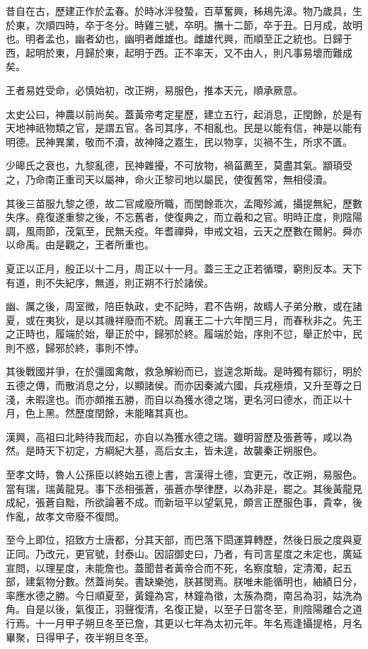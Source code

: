 昔自在古，歷建正作於孟春。於時冰泮發蟄，百草奮興，秭鳺先滜。物乃歲具，生於東，次順四時，卒于冬分。時雞三號，卒明。撫十二節，卒于丑。日月成，故明也。明者孟也，幽者幼也，幽明者雌雄也。雌雄代興，而順至正之統也。日歸于西，起明於東，月歸於東，起明于西。正不率天，又不由人，則凡事易壞而難成矣。

王者易姓受命，必慎始初，改正朔，易服色，推本天元，順承厥意。

太史公曰，神農以前尚矣。蓋黃帝考定星歷，建立五行，起消息，正閏餘，於是有天地神祇物類之官，是謂五官。各司其序，不相亂也。民是以能有信，神是以能有明德。民神異業，敬而不瀆，故神降之嘉生，民以物享，災禍不生，所求不匱。

少暤氏之衰也，九黎亂德，民神雜擾，不可放物，禍菑薦至，莫盡其氣。顓頊受之，乃命南正重司天以屬神，命火正黎司地以屬民，使復舊常，無相侵瀆。

其後三苗服九黎之德，故二官咸廢所職，而閏餘乖次，孟陬殄滅，攝提無紀，歷數失序。堯復遂重黎之後，不忘舊者，使復典之，而立羲和之官。明時正度，則陰陽調，風雨節，茂氣至，民無夭疫。年耆禪舜，申戒文祖，云天之歷數在爾躬。舜亦以命禹。由是觀之，王者所重也。

夏正以正月，殷正以十二月，周正以十一月。蓋三王之正若循環，窮則反本。天下有道，則不失紀序，無道，則正朔不行於諸侯。

幽、厲之後，周室微，陪臣執政，史不記時，君不告朔，故疇人子弟分散，或在諸夏，或在夷狄，是以其禨祥廢而不統。周襄王二十六年閏三月，而春秋非之。先王之正時也，履端於始，舉正於中，歸邪於終。履端於始，序則不愆，舉正於中，民則不惑，歸邪於終，事則不悖。

其後戰國并爭，在於彊國禽敵，救急解紛而已，豈遑念斯哉。是時獨有鄒衍，明於五德之傳，而散消息之分，以顯諸侯。而亦因秦滅六國，兵戎極煩，又升至尊之日淺，未暇遑也。而亦頗推五勝，而自以為獲水德之瑞，更名河曰德水，而正以十月，色上黑。然歷度閏餘，未能睹其真也。

漢興，高祖曰北畤待我而起，亦自以為獲水德之瑞。雖明習歷及張蒼等，咸以為然。是時天下初定，方綱紀大基，高后女主，皆未遑，故襲秦正朔服色。

至孝文時，魯人公孫臣以終始五德上書，言漢得土德，宜更元，改正朔，易服色。當有瑞，瑞黃龍見。事下丞相張蒼，張蒼亦學律歷，以為非是，罷之。其後黃龍見成紀，張蒼自黜，所欲論著不成。而新垣平以望氣見，頗言正歷服色事，貴幸，後作亂，故孝文帝廢不復問。

至今上即位，招致方士唐都，分其天部，而巴落下閎運算轉歷，然後日辰之度與夏正同。乃改元，更官號，封泰山。因詔御史曰，乃者，有司言星度之未定也，廣延宣問，以理星度，未能詹也。蓋聞昔者黃帝合而不死，名察度驗，定清濁，起五部，建氣物分數。然蓋尚矣。書缺樂弛，朕甚閔焉。朕唯未能循明也，紬績日分，率應水德之勝。今日順夏至，黃鐘為宮，林鐘為徵，太蔟為商，南呂為羽，姑洗為角。自是以後，氣復正，羽聲復清，名復正變，以至子日當冬至，則陰陽離合之道行焉。十一月甲子朔旦冬至已詹，其更以七年為太初元年。年名焉逢攝提格，月名畢聚，日得甲子，夜半朔旦冬至。

